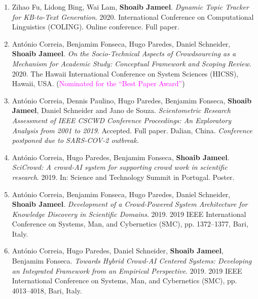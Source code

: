\documentclass[margin]{res}
\begin{document}
\begin{resume}
\begin{enumerate}
\item Zihao Fu, Lidong Bing, Wai Lam, \textbf{Shoaib Jameel}. \textit{Dynamic Topic Tracker for KB-to-Text Generation}. 2020. International Conference on Computational Linguistics (COLING). Online conference. Full paper. \newline

\item Ant\'onio Correia, Benjamim Fonseca, Hugo Paredes, Daniel Schneider, \textbf{Shoaib Jameel}. \textit{On the Socio-Technical Aspects of Crowdsourcing as a Mechanism for Academic Study: Conceptual Framework and Scoping Review}. 2020. The Hawaii International Conference on System Sciences (HICSS), Hawaii, USA. (\textcolor{magenta}{Nominated for the ``Best Paper Award''}) \newline

\item Ant\'onio Correia, Dennis Paulino, Hugo Paredes, Benjamim Fonseca, \textbf{Shoaib Jameel}, Daniel Schneider and Jano de Souza. \textit{Scientometric Research Assessment of IEEE CSCWD Conference Proceedings: An Exploratory Analysis from 2001 to 2019}. Accepted. Full paper. Dalian, China. \textit{Conference postponed due to SARS-COV-2 outbreak.} \newline

\item Ant\'onio Correia, Hugo Paredes, Benjamim Fonseca, \textbf{Shoaib Jameel}. \textit{SciCrowd: A crowd-AI system for supporting crowd work in scientific research}. 2019. In: Science and Technology Summit in Portugal. Poster. \newline

\item Ant\'onio Correia, Benjamim Fonseca, Hugo Paredes, Daniel Schneider, \textbf{Shoaib Jameel}. \textit{Development of a Crowd-Powered System Architecture for Knowledge Discovery in Scientific Domains}. 2019. 2019 IEEE International Conference on Systems, Man, and Cybernetics (SMC), pp. 1372--1377, Bari, Italy. \newline

\item Ant\'onio Correia, Hugo Paredes, Daniel Schneider, \textbf{Shoaib Jameel}, Benjamim Fonseca. \textit{Towards Hybrid Crowd-AI Centered Systems: Developing an Integrated Framework from an Empirical Perspective}. 2019. 2019 IEEE International Conference on Systems, Man, and Cybernetics (SMC), pp. 4013--4018, Bari, Italy. \newline


\end{enumerate}
\end{resume}
\end{document}
